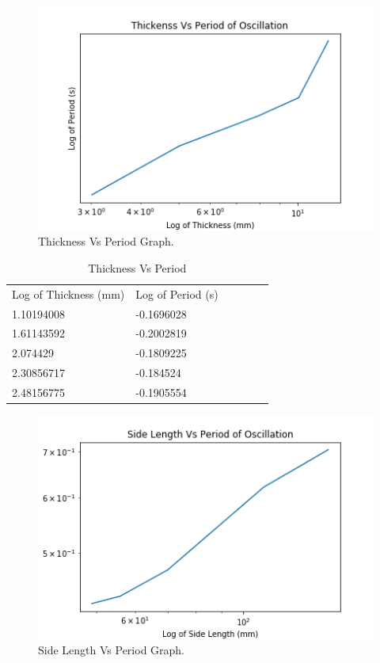 \documentclass[12pt]{article}
\begin{document}
\begin{multicols}{2}

\begin{figure}[H]
\centering
\includegraphics[scale=0.6]{Media/Thickness_Vs_Period.png}
\caption{Thickness Vs Period Graph.}
\label{Thickness Vs Period Graph}
\end{figure}

\begin{table}[H]
\centering
\caption{Thickness Vs Period}
\label{Thickness Vs Period}
\begin{tabular}{llllll}
Log of Thickness (mm) & Log of Period (s) \\
1.10194008           & -0.1696028      \\
1.61143592           & -0.2002819      \\
2.074429           & -0.1809225      \\
2.30856717          & -0.184524      \\
2.48156775          & -0.1905554     
\end{tabular}
\end{table}

\begin{figure}[H]
\centering
\includegraphics[scale=0.6]{Media/Side_Length_Vs_Period.png}
\caption{Side Length Vs Period Graph.}
\label{Side Length Vs Period Graph}
\end{figure}


\end{multicols}
\end{document}
